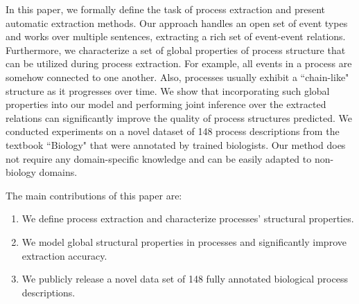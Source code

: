 
In this paper, we formally define the task of process extraction and present automatic extraction methods. 
Our approach handles an open set of event types and works over multiple sentences, extracting a rich set of event-event relations.
Furthermore, we characterize a set of global properties of process structure that can be utilized during process extraction. 
For example, all events in a process are somehow connected to one another. Also, processes usually exhibit a ``chain-like" structure as it progresses over time. 
We show that incorporating such global properties into our model and performing joint inference over the extracted relations can significantly improve the quality of process structures predicted.  
We conducted experiments on a novel dataset of 148 process descriptions from the textbook ``Biology" \cite{CampbellReece} that were annotated by trained biologists. Our method does not require any domain-specific knowledge and can be easily adapted to non-biology domains.

The main contributions of this paper are:
\begin{enumerate}[itemsep=0pt,topsep=0pt] 
\item We define process extraction and characterize processes' structural properties.
\item We model global structural properties in processes and significantly improve extraction accuracy.
\item We publicly release a novel data set of 148 fully annotated biological process descriptions.
\end{enumerate}
